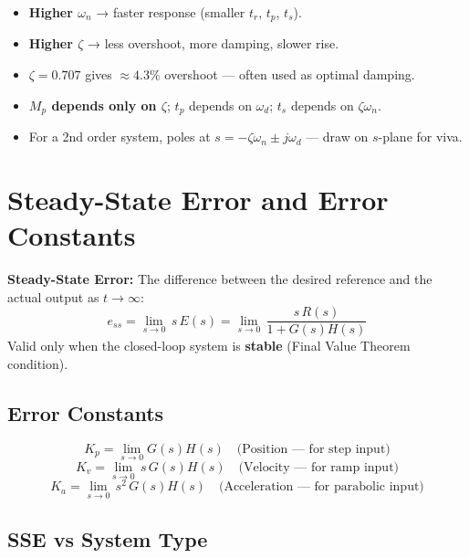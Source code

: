 \documentclass[12pt,a4paper]{article}
\begin{document}
\begin{tcolorbox}[exambox, title={Exam Tips — Time Domain Specs}]
\begin{itemize}[leftmargin=*, itemsep=3pt, topsep=0pt]
  \item \textbf{Higher $\omega_n$} → faster response (smaller $t_r$, $t_p$, $t_s$).
  \item \textbf{Higher $\zeta$} → less overshoot, more damping, slower rise.
  \item \textbf{$\zeta = 0.707$} gives $\approx 4.3\%$ overshoot — often used as optimal damping.
  \item \textbf{$M_p$ depends only on $\zeta$}; $t_p$ depends on $\omega_d$; $t_s$ depends on $\zeta\omega_n$.
  \item For a 2nd order system, poles at $s = -\zeta\omega_n \pm j\omega_d$ — draw on $s$-plane for viva.
\end{itemize}
\end{tcolorbox}

\section{Steady-State Error and Error Constants}

\begin{tcolorbox}[defbox]
\textbf{Steady-State Error:} The difference between the desired reference and the actual output as $t \to \infty$:
$$e_{ss} = \lim_{s \to 0}\, s\,E(s) = \lim_{s \to 0}\, \frac{s\,R(s)}{1 + G(s)H(s)}$$
Valid only when the closed-loop system is \textbf{stable} (Final Value Theorem condition).
\end{tcolorbox}

\subsection{Error Constants}

\begin{tcolorbox}[formulabox, title={Static Error Constants}]
$$K_p = \lim_{s\to 0} G(s)H(s) \quad \text{(Position — for step input)}$$
$$K_v = \lim_{s\to 0}\, s\,G(s)H(s) \quad \text{(Velocity — for ramp input)}$$
$$K_a = \lim_{s\to 0}\, s^2\,G(s)H(s) \quad \text{(Acceleration — for parabolic input)}$$
\end{tcolorbox}

\subsection{SSE vs System Type}
\end{document}
